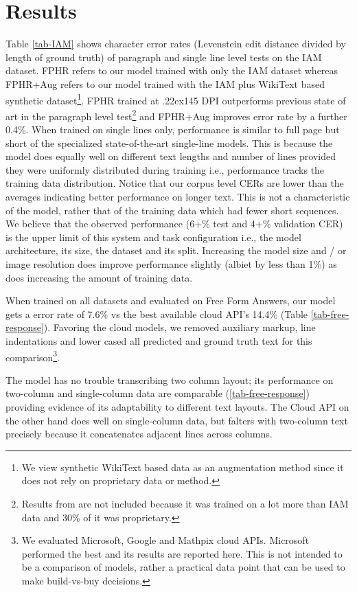 \documentclass[runningheads]{llncs}
\newcommand{\tilda}{\raise.22ex\hbox{}}
\begin{document}
\section{Results}
Table \ref{tab-IAM} shows character error rates (Levenstein edit distance divided by length of ground truth) of paragraph and single line level tests on the IAM dataset. FPHR refers to our model trained with only the IAM dataset whereas FPHR+Aug refers to our model trained with the IAM plus WikiText based synthetic dataset\footnote{We view synthetic WikiText based data as an augmentation method since it does not rely on proprietary data or method.}.
FPHR trained at \tilda 145 DPI outperforms previous state of art in the paragraph level test\footnote{Results from \citep{8270042} are not included because it was trained on a lot more than IAM  data and 30\% of it was proprietary.} and FPHR+Aug improves error rate by a further 0.4\%.
When trained on single lines only, performance is similar to full page but short of the specialized state-of-the-art single-line models. This is because the model does equally well on different text lengths and number of lines provided they were uniformly distributed during training i.e., performance tracks the training data distribution. Notice that our corpus level CERs are lower than the averages indicating better performance on longer text. This is not a characteristic of the model, rather that of the training data which had fewer short sequences. We believe that the observed performance (6+\% test and 4+\% validation CER) is the upper limit of this system and task configuration i.e., the model architecture, its size, the dataset and its split. Increasing the model size and / or image resolution does improve performance slightly (albiet by less than 1\%) as does increasing the amount of training data.

When trained on all datasets and evaluated on Free Form Answers, our model gets a error rate of 7.6\% vs the best available cloud API's 14.4\% (Table \ref{tab-free-response}). Favoring the cloud models, we removed auxiliary markup, line indentations and lower cased all predicted and ground truth text for this comparison\footnote{We evaluated Microsoft, Google and Mathpix cloud APIs. Microsoft performed the best and its results are reported here. This is not intended to be a comparison of models, rather a practical data point that can be used to make build-vs-buy decisions.}.

The model has no trouble transcribing two column layout; its performance on two-column and single-column data are comparable (\autoref{tab-free-response}) providing evidence of its adaptability to different text layouts. The Cloud API on the other hand does well on single-column data, but falters with two-column text precisely because it concatenates adjacent lines across columns.
\end{document}
